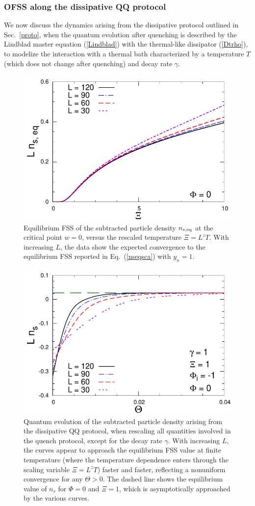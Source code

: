 \subsubsection{OFSS along the dissipative QQ protocol}
\label{scalprotb}

We now discuss the dynamics arising from the dissipative protocol
outlined in Sec.~\ref{proto}, when the quantum evolution after
quenching is described by the Lindblad master equation
(\ref{Lindblad}) with the thermal-like dissipator (\ref{Dtrho}), to
modelize the interaction with a thermal bath characterized by a
temperature $T$ (which does not change after quenching)
and decay rate $\gamma$.

\begin{figure}[!htb]
\centering
  \includegraphics[width=0.6\columnwidth]{imm/LNeqXik0.pdf}
  \caption{ Equilibrium FSS of the subtracted particle density
    $n_{s,{\rm eq}}$ at the critical point $w=0$, versus the rescaled
    temperature $\Xi=L^z T$. With increasing $L$, the data show the
    expected convergence to the equilibrium FSS reported in
    Eq.~(\ref{nseqsca}) with $y_n=1$. }
  \label{eqns}
\end{figure}

  
\begin{figure}[!htb]
\centering
  \includegraphics[width=0.6\columnwidth]{imm/LNk-1q0e100t100g1000.pdf}
  \caption{Quantum evolution of the subtracted particle density
    arising from the dissipative QQ protocol, when rescaling all
    quantities involved in the quench protocol, except for the decay
    rate $\gamma$. With increasing $L$, the curves appear to approach
    the equilibrium FSS value at finite temperature (where the
    temperature dependence enters through the scaling variable
    $\Xi=L^z T$) faster and faster, reflecting a nonuniform
    convergence for any $\Theta>0$. The dashed line shows the
    equilibrium value of $n_s$ for $\Phi=0$ and $\Xi=1$, which is
    asymptotically approached by the various curves.  }
  \label{protbresgamma}
\end{figure}



